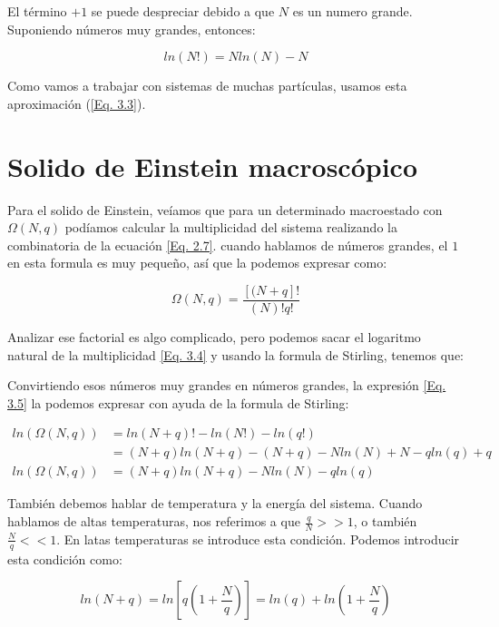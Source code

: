 \documentclass[11pt,fleqn]{book}
\begin{document}
El término $+1$ se puede despreciar debido a que $N$ es un numero grande. Suponiendo números muy grandes, entonces:

\begin{equation*}
    ln(N!)=Nln(N)-N
\end{equation*}

Como vamos a trabajar con sistemas de muchas partículas, usamos esta aproximación (\ref{Eq. 3.3}).

\section{Solido de Einstein macroscópico}

Para el solido de Einstein, veíamos que para un determinado macroestado con $\Omega(N,q)$ podíamos calcular la multiplicidad del sistema realizando la combinatoria de la ecuación \ref{Eq. 2.7}. cuando hablamos de números grandes, el $1$ en esta formula es muy pequeño, así que la podemos expresar como:

\begin{equation}
     \Omega(N,q)=\frac{\left[(N+q\right]!}{(N)!q!}
     \label{Eq. 3.4}
\end{equation}

Analizar ese factorial es algo complicado, pero podemos sacar el logaritmo natural de la multiplicidad \ref{Eq. 3.4} y usando la formula de Stirling, tenemos que:

Convirtiendo esos números muy grandes en números grandes, la expresión \ref{Eq. 3.5} la podemos expresar con ayuda de la formula de Stirling:

\begin{equation}
\begin{split}
    ln(\Omega(N,q))&=ln(N+q)!-ln(N!)-ln(q!)\\
    &=(N+q)ln(N+q)-(N+q)-Nln(N)+N-qln(q)+q\\
    ln(\Omega(N,q))&=(N+q)ln(N+q)-Nln(N)-qln(q)
\end{split}
        \label{Eq. 3.5}
\end{equation}

También debemos hablar de temperatura y la energía del sistema. Cuando hablamos de altas temperaturas, nos referimos a que $\frac{q}{N}>>1$, o también $\frac{N}{q}<<1$. En latas temperaturas se introduce esta condición. Podemos introducir esta condición como:

\begin{equation*}
    ln(N+q)=ln\left[q\left(1+\frac{N}{q}\right)\right]=ln(q)+ln\left(1+\frac{N}{q}\right)
\end{equation*}
\end{document}
